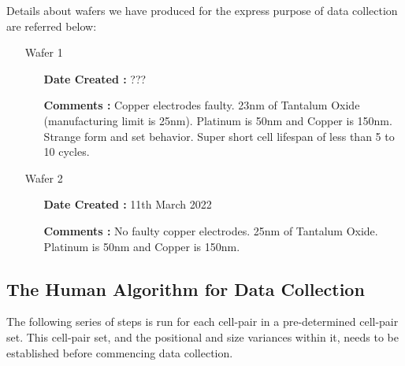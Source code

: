 \documentclass{article}
\begin{document}
        Details about wafers we have produced for the express purpose of data collection are referred below:

          \begin{itemize}
            \item [Wafer 1] 
              \begin{itemize}
                \item [] \textbf{Date Created :} ???
                \item [] \textbf{Comments :} Copper electrodes faulty. 23nm of Tantalum Oxide (manufacturing limit is
                  25nm). Platinum is 50nm and Copper is 150nm. Strange form and set behavior. Super short cell lifespan
                  of less than 5 to 10 cycles. 
              \end{itemize}
            \item [Wafer 2] 
              \begin{itemize}
                \item [] \textbf{Date Created :} 11th March 2022
                \item [] \textbf{Comments :} No faulty copper electrodes. 25nm of Tantalum Oxide. Platinum is 50nm and    
                  Copper is 150nm.
              \end{itemize}
          \end{itemize}

      
      \subsection{The Human Algorithm for Data Collection} \label{humanalgorithm}

        The following series of steps is run for each cell-pair in a pre-determined cell-pair set. This cell-pair set,
        and the positional and size variances within it, needs to be established before commencing data collection.
        
\end{document}

